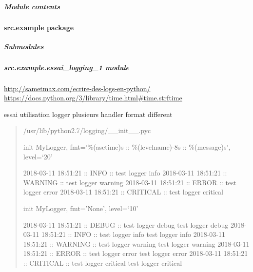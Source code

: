 \documentclass[a4paper,10pt,english]{sphinxmanual}
\begin{document}
\begin{fulllineitems}
\begin{fulllineitems}
\label{commands/apidoc/src.colorama:src.colorama.winterm.WinTerm.set_title}
\end{fulllineitems}


\begin{fulllineitems}
\label{commands/apidoc/src.colorama:src.colorama.winterm.WinTerm.style}
\end{fulllineitems}


\end{fulllineitems}



\subparagraph{Module contents}
\label{commands/apidoc/src.colorama:module-src.colorama}\label{commands/apidoc/src.colorama:module-contents}

\paragraph{src.example package}
\label{commands/apidoc/src.example:src-example-package}\label{commands/apidoc/src.example::doc}

\subparagraph{Submodules}
\label{commands/apidoc/src.example:submodules}

\subparagraph{src.example.essai\_logging\_1 module}
\label{commands/apidoc/src.example:module-src.example.essai_logging_1}\label{commands/apidoc/src.example:src-example-essai-logging-1-module}
\url{http://sametmax.com/ecrire-des-logs-en-python/}
\url{https://docs.python.org/3/library/time.html\#time.strftime}

essai utilisation logger plusieurs handler format different
\begin{quote}

/usr/lib/python2.7/logging/\_\_init\_\_.pyc

init MyLogger, fmt='\%(asctime)s :: \%(levelname)-8s :: \%(message)s', level=`20'

2018-03-11 18:51:21 :: INFO     :: test logger info
2018-03-11 18:51:21 :: WARNING  :: test logger warning
2018-03-11 18:51:21 :: ERROR    :: test logger error
2018-03-11 18:51:21 :: CRITICAL :: test logger critical

init MyLogger, fmt='None', level=`10'

2018-03-11 18:51:21 :: DEBUG    :: test logger debug
test logger debug
2018-03-11 18:51:21 :: INFO     :: test logger info
test logger info
2018-03-11 18:51:21 :: WARNING  :: test logger warning
test logger warning
2018-03-11 18:51:21 :: ERROR    :: test logger error
test logger error
2018-03-11 18:51:21 :: CRITICAL :: test logger critical
test logger critical
\end{quote}
\end{document}
